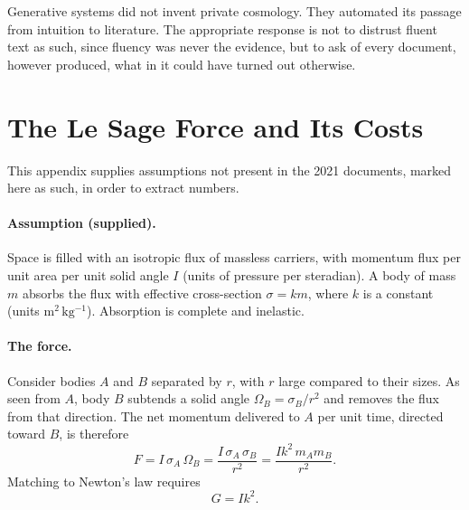 \documentclass[11pt]{article}
\begin{document}
Generative systems did not invent private cosmology. They automated its passage from intuition to literature. The appropriate response is not to distrust fluent text as such, since fluency was never the evidence, but to ask of every document, however produced, what in it could have turned out otherwise.

\appendix

\section{The Le Sage Force and Its Costs}
\label{app:lesage}

This appendix supplies assumptions not present in the 2021 documents, marked here as such, in order to extract numbers.

\paragraph{Assumption (supplied).} Space is filled with an isotropic flux of massless carriers, with momentum flux per unit area per unit solid angle $I$ (units of pressure per steradian). A body of mass $m$ absorbs the flux with effective cross-section $\sigma = k m$, where $k$ is a constant (units $\mathrm{m^2\,kg^{-1}}$). Absorption is complete and inelastic.

\paragraph{The force.} Consider bodies $A$ and $B$ separated by $r$, with $r$ large compared to their sizes. As seen from $A$, body $B$ subtends a solid angle $\Omega_B = \sigma_B / r^2$ and removes the flux from that direction. The net momentum delivered to $A$ per unit time, directed toward $B$, is therefore
\begin{equation}
F = I\,\sigma_A\,\Omega_B = \frac{I\,\sigma_A\,\sigma_B}{r^2} = \frac{I k^2\, m_A m_B}{r^2}.
\end{equation}
Matching to Newton's law requires
\begin{equation}
G = I k^2.
\end{equation}
\end{document}
